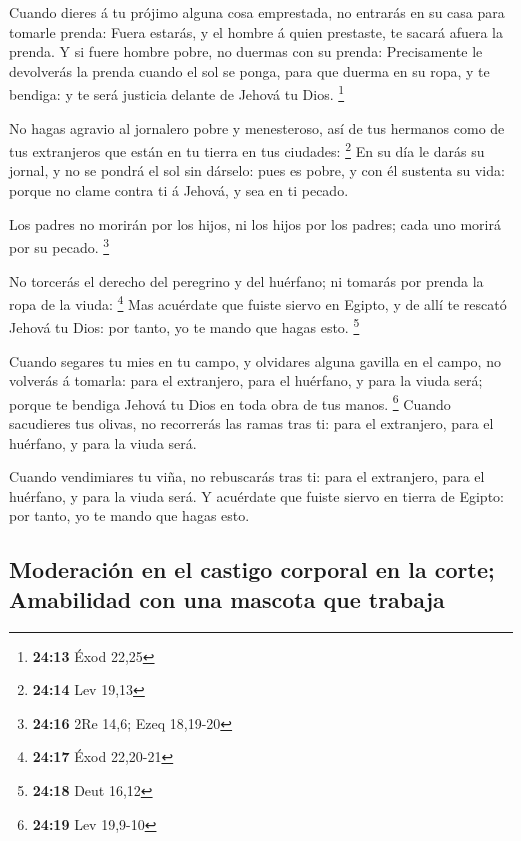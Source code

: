  Cuando dieres á tu prójimo alguna cosa emprestada, no
entrarás en su casa para tomarle prenda:  Fuera estarás, y
el hombre á quien prestaste, te sacará afuera la prenda.  Y
si fuere hombre pobre, no duermas con su prenda: 
Precisamente le devolverás la prenda cuando el sol se ponga, para que
duerma en su ropa, y te bendiga: y te será justicia delante de Jehová tu
Dios. \footnote{\textbf{24:13} Éxod 22,25}

 No hagas agravio al jornalero pobre y menesteroso, así de
tus hermanos como de tus extranjeros que están en tu tierra en tus
ciudades: \footnote{\textbf{24:14} Lev 19,13}  En su día le
darás su jornal, y no se pondrá el sol sin dárselo: pues es pobre, y con
él sustenta su vida: porque no clame contra ti á Jehová, y sea en ti
pecado.

 Los padres no morirán por los hijos, ni los hijos por los
padres; cada uno morirá por su pecado. \footnote{\textbf{24:16} 2Re
  14,6; Ezeq 18,19-20}

 No torcerás el derecho del peregrino y del huérfano; ni
tomarás por prenda la ropa de la viuda: \footnote{\textbf{24:17} Éxod
  22,20-21}  Mas acuérdate que fuiste siervo en Egipto, y
de allí te rescató Jehová tu Dios: por tanto, yo te mando que hagas
esto. \footnote{\textbf{24:18} Deut 16,12}

 Cuando segares tu mies en tu campo, y olvidares alguna
gavilla en el campo, no volverás á tomarla: para el extranjero, para el
huérfano, y para la viuda será; porque te bendiga Jehová tu Dios en toda
obra de tus manos. \footnote{\textbf{24:19} Lev 19,9-10} 
Cuando sacudieres tus olivas, no recorrerás las ramas tras ti: para el
extranjero, para el huérfano, y para la viuda será.

 Cuando vendimiares tu viña, no rebuscarás tras ti: para el
extranjero, para el huérfano, y para la viuda será.  Y
acuérdate que fuiste siervo en tierra de Egipto: por tanto, yo te mando
que hagas esto.

\hypertarget{moderaciuxf3n-en-el-castigo-corporal-en-la-corte-amabilidad-con-una-mascota-que-trabaja}{%
\subsection{Moderación en el castigo corporal en la corte; Amabilidad
con una mascota que
trabaja}\label{moderaciuxf3n-en-el-castigo-corporal-en-la-corte-amabilidad-con-una-mascota-que-trabaja}}

